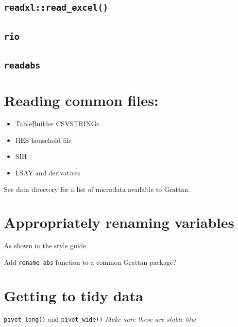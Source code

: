 \documentclass[]{book}
\providecommand{\tightlist}{%
  \setlength{\itemsep}{0pt}\setlength{\parskip}{0pt}}
\begin{document}
\hypertarget{readxlread_excel}{%
\subsection{\texorpdfstring{\texttt{readxl::read\_excel()}}{readxl::read\_excel()}}\label{readxlread_excel}}

\hypertarget{rio}{%
\subsection{\texorpdfstring{\texttt{rio}}{rio}}\label{rio}}

\hypertarget{readabs}{%
\subsection{\texorpdfstring{\texttt{readabs}}{readabs}}\label{readabs}}

\hypertarget{reading-common-files}{%
\section{Reading common files:}\label{reading-common-files}}

\begin{itemize}
\tightlist
\item
  TableBuilder CSVSTRINGs
\item
  HES household file
\item
  SIH
\item
  LSAY and derivatives
\end{itemize}

See data directory for a list of microdata available to Grattan.

\hypertarget{appropriately-renaming-variables}{%
\section{Appropriately renaming variables}\label{appropriately-renaming-variables}}

As shown in the style guide

Add \texttt{rename\_abs} function to a common Grattan package?

\hypertarget{getting-to-tidy-data}{%
\section{Getting to tidy data}\label{getting-to-tidy-data}}

\texttt{pivot\_long()} and \texttt{pivot\_wide()}
\emph{Make sure these are stable btw}
\end{document}
